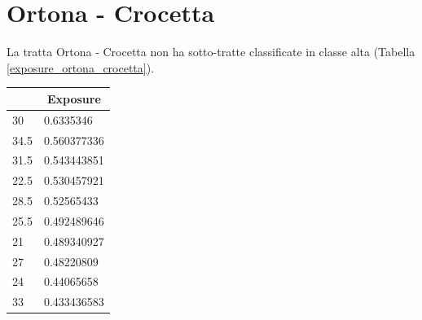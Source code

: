 \section{Ortona - Crocetta}
La tratta Ortona - Crocetta non ha sotto-tratte classificate in classe alta (Tabella \ref{exposure_ortona_crocetta}). 
\begin{table}[H]
	\centering
	\begin{tabular}{|l|l|}
		\hline
		\rowcolor[HTML]{C0C0C0} 
		\multicolumn{1}{|c|}{\cellcolor[HTML]{C0C0C0}\textbf{Km}} & \multicolumn{1}{c|}{\cellcolor[HTML]{C0C0C0}\textbf{Exposure}} \\ \hline
		\rowcolor[HTML]{F8FF00} 
		30                                                        & 0.6335346                                                      \\ \hline
		\rowcolor[HTML]{F8FF00} 
		34.5                                                      & 0.560377336                                                    \\ \hline
		\rowcolor[HTML]{F8FF00} 
		31.5                                                      & 0.543443851                                                    \\ \hline
		\rowcolor[HTML]{F8FF00} 
		22.5                                                      & 0.530457921                                                    \\ \hline
		\rowcolor[HTML]{F8FF00} 
		28.5                                                      & 0.52565433                                                     \\ \hline
		\rowcolor[HTML]{F8FF00} 
		25.5                                                      & 0.492489646                                                    \\ \hline
		\rowcolor[HTML]{F8FF00} 
		21                                                        & 0.489340927                                                    \\ \hline
		\rowcolor[HTML]{F8FF00} 
		27                                                        & 0.48220809                                                     \\ \hline
		\rowcolor[HTML]{F8FF00} 
		24                                                        & 0.44065658                                                     \\ \hline
		\rowcolor[HTML]{F8FF00} 
		33                                                        & 0.433436583                                                    \\ \hline

\end{tabular}
\end{table}

